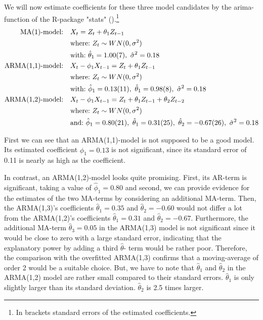 \documentclass[11pt,a4paper]{article}
\begin{document}
We will now estimate coefficients for these three model candidates by the arima-function of the R-package "stats" (\citet{R_stats}).\footnote{In brackets standard errors of the estimated coefficients.}
\begin{align*}
    \text{MA(1)-model:} \quad & X_t = Z_t + \theta_1 Z_{t-1} \\
    & \text{where:} \  {Z_t} \sim WN(0,\sigma^2)  \\
    & \text{with:} \ 
        \hat{\theta}_1 = \num{ 1.00 \pm 0.07}, \ 
        \hat{\sigma}^2 = \num{ 0.18 }
\\
    \text{ARMA(1,1)-model:} \quad & X_t - \phi_1 X_{t-1} = Z_t + \theta_1 Z_{t-1} \\
    & \text{where:} \  {Z_t} \sim WN(0,\sigma^2) \\
    & \text{with:} \ 
        \hat{\phi}_1 = \num{ 0.13 \pm 0.11}, \ 
        \hat{\theta}_1 = \num{ 0.98 \pm 0.08}, \ 
        \hat{\sigma}^2 = \num{ 0.18 }
\\
    \text{ARMA(1,2)-model:} \quad & X_t - \phi_1 X_{t-1} = Z_t + \theta_1 Z_{t-1} + \theta_2 Z_{t-2} \\
    & \text{where:} \  {Z_t} \sim WN(0,\sigma^2) \\
    & \text{and:} \ 
        \hat{\phi}_1 = \num{ 0.80 \pm 0.21}, \ 
        \hat{\theta}_1 = \num{ 0.31 \pm 0.25}, \ 
        \hat{\theta}_2 = \num{-0.67 \pm 0.26}, \ 
        \hat{\sigma}^2 = \num{0.18}
\end{align*}

First we can see that an ARMA(1,1)-model is not supposed to be a good model.
Its estimated coefficient $\hat{\phi}_1=0.13$ is not significant, since its standard error of 0.11 is nearly as high as the coefficient.

In contrast, an ARMA(1,2)-model looks quite promising.
First, its AR-term is significant, taking a value of $\hat{\phi}_1=0.80$ and second, we can provide evidence for the estimates of the two MA-terms by considering an additional MA-term.
Then, the ARMA(1,3)'s coefficients $\hat{\theta}_1 = 0.35$ and $\hat{\theta}_2= -0.60$ would not differ a lot from the ARMA(1,2)'s coefficients $\hat{\theta}_1 = 0.31$ and $\hat{\theta}_2 = -0.67$.
Furthermore, the additional MA-term $\hat{\theta}_3 = 0.05$ in the ARMA(1,3) model is not significant since it would be close to zero with a large standard error, indicating that the explanatory power by adding a third $\hat{\theta}$- term would be rather poor.
Therefore, the comparison with the overfitted ARMA(1,3) confirms that a moving-average of order 2 would be a suitable choice.
But, we have to note that $\hat{\theta}_1$ and $\hat{\theta}_2$ in the ARMA(1,2) model are rather small compared to their standard errors.
$\hat{\theta}_1$ is only slightly larger than its standard deviation.
$\hat{\theta}_2$ is 2.5 times larger.
\end{document}
